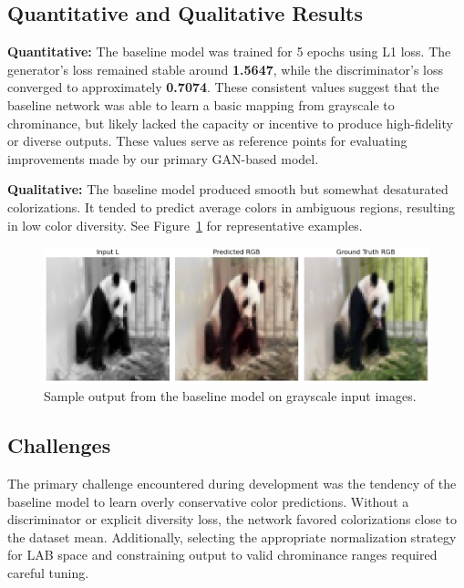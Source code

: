 \documentclass{article} %
\begin{document}
\subsection{Quantitative and Qualitative Results}

\textbf{Quantitative:} The baseline model was trained for 5 epochs using L1 loss. The generator's loss remained stable around \textbf{1.5647}, while the discriminator's loss 
converged to approximately \textbf{0.7074}. These consistent values suggest that the baseline network was able to learn a basic mapping from grayscale to chrominance, but likely 
lacked the capacity or incentive to produce high-fidelity or diverse outputs. These values serve as reference points for evaluating improvements made by our primary GAN-based model.

\textbf{Qualitative:} The baseline model produced smooth but somewhat desaturated colorizations. It tended to predict average colors in ambiguous regions, resulting in low color 
diversity. See Figure~\ref{fig:baseline_outputs} for representative examples.

\begin{figure}[htbp]
    \centering
    \includegraphics[width=\textwidth]{Figs/baseline_output.png}
    \caption{Sample output from the baseline model on grayscale input images.}
    \label{fig:baseline_outputs}
\end{figure}

\subsection{Challenges}

The primary challenge encountered during development was the tendency of the baseline model to learn overly conservative color predictions. Without a discriminator or explicit 
diversity loss, the network favored colorizations close to the dataset mean. Additionally, selecting the appropriate normalization strategy for LAB space and constraining output to 
valid chrominance ranges required careful tuning.
\end{document}

